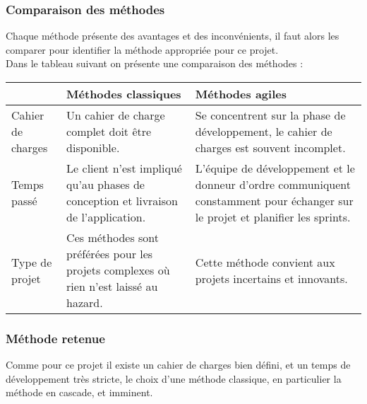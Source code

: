 \subsubsection{Comparaison des méthodes}
Chaque méthode présente des avantages et des inconvénients, il faut alors les comparer pour identifier la méthode appropriée pour ce projet.\\
\noindent Dans le tableau suivant on présente une comparaison des méthodes :\\
\begin{center}
    \begin{tabularx}{0.8\textwidth} {
            | >{\centering\arraybackslash}X
            | >{\centering\arraybackslash}X
            | >{\centering\arraybackslash}X |}
        \hline
                          & Méthodes classiques                                                                    & Méthodes agiles                                                                                                                \\
        \hline
        Cahier de charges & Un cahier de charge complet doit être disponible.                                      & Se concentrent sur la phase de développement, le cahier de charges est souvent incomplet.                                      \\
        \hline
        Temps passé       & Le client n'est impliqué qu'au phases de conception et livraison de l'application.     & L'équipe de développement et le donneur d'ordre communiquent constamment pour échanger sur le projet et planifier les sprints. \\
        \hline
        Type de projet    & Ces méthodes sont préférées pour les projets complexes où rien n'est laissé au hazard. & Cette méthode convient aux projets incertains et innovants.                                                                    \\
        \hline
    \end{tabularx}
\end{center}
\subsubsection{Méthode retenue}
Comme pour ce projet il existe un cahier de charges bien défini, et un temps de développement très stricte, le choix d'une méthode classique, en particulier la méthode en cascade, et imminent.

